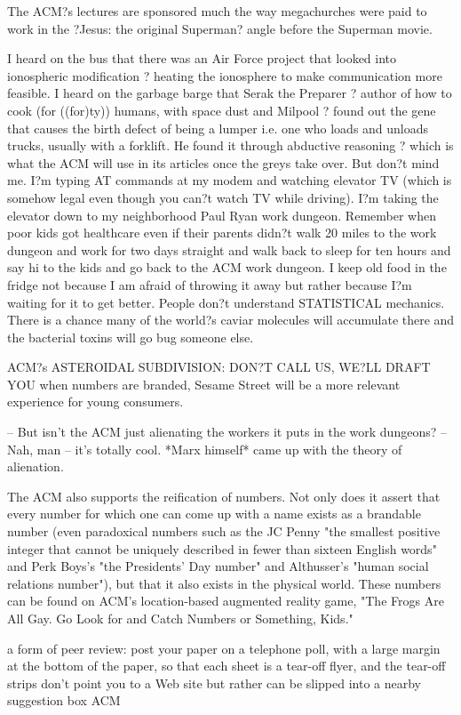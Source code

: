 The ACM?s lectures are sponsored much the way megachurches were paid to work in the ?Jesus: the original Superman? angle before the Superman movie.

I heard on the bus that there was an Air Force project that looked into ionospheric modification ? heating the ionosphere to make communication more feasible. I heard on the garbage barge that Serak the Preparer ? author of how to cook (for ((for)ty)) humans, with space dust and Milpool ? found out the gene that causes the birth defect of being a lumper i.e. one who loads and unloads trucks, usually with a forklift. He found it through abductive reasoning ? which is what the ACM will use in its articles once the greys take over. But don?t mind me. I?m typing AT commands at my modem and watching elevator TV (which is somehow legal even though you can?t watch TV while driving). I?m taking the elevator down to my neighborhood Paul Ryan work dungeon. Remember when poor kids got healthcare even if their parents didn?t walk 20 miles to the work dungeon and work for two days straight and walk back to sleep for ten hours and say hi to the kids and go back to the ACM work dungeon. I keep old food in the fridge not because I am afraid of throwing it away but rather because I?m waiting for it to get better. People don?t understand STATISTICAL mechanics. There is a chance many of the world?s caviar molecules will accumulate there and the bacterial toxins will go bug someone else.

ACM?s ASTEROIDAL SUBDIVISION: DON?T CALL US, WE?LL DRAFT YOU
when numbers are branded, Sesame Street will be a more relevant experience for young consumers.

-- But isn't the ACM just alienating the workers it puts in the work dungeons?
-- Nah, man -- it's totally cool. *Marx himself* came up with the theory of alienation.

The ACM also supports the reification of numbers. Not only does it assert that every number for which one can come up with a name exists as a brandable number (even paradoxical numbers such as the JC Penny "the smallest positive integer that cannot be uniquely described in fewer than sixteen English words" and Perk Boys's "the Presidents' Day number" and Althusser's "human social relations number"), but that it also exists in the physical world. These numbers can be found on ACM's location-based augmented reality game, "The Frogs Are All Gay. Go Look for and Catch Numbers or Something, Kids."


a form of peer review: post your paper on a telephone poll, with a large margin at the bottom of the paper, so that each sheet is a tear-off flyer, and the tear-off strips don't point you to a Web site but rather can be slipped into a nearby suggestion box ACM


